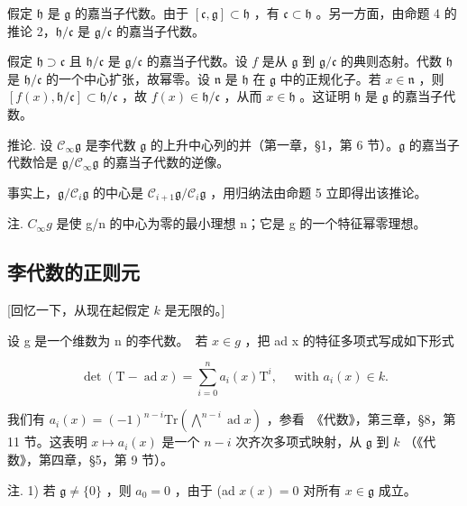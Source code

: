 假定 \(\mathfrak{h}\) 是 \(\mathfrak{g}\) 的嘉当子代数。由于 \([\mathfrak{c},\mathfrak{g}]\subset \mathfrak{h}\) ，有 \(\mathfrak{c}\subset \mathfrak{h}\) 。另一方面，由命题 4 的推论 2，\(\mathfrak{h} / \mathfrak{c}\) 是 \(\mathfrak{g} / \mathfrak{c}\) 的嘉当子代数。

假定 \(\mathfrak{h} \supset \mathfrak{c}\) 且 \(\mathfrak{h} / \mathfrak{c}\) 是 \(\mathfrak{g} / \mathfrak{c}\) 的嘉当子代数。设 \(f\) 是从 \(\mathfrak{g}\) 到 \(\mathfrak{g} / \mathfrak{c}\) 的典则态射。代数 \(\mathfrak{h}\) 是 \(\mathfrak{h} / \mathfrak{c}\) 的一个中心扩张，故幂零。设 \(\mathfrak{n}\) 是 \(\mathfrak{h}\) 在 \(\mathfrak{g}\) 中的正规化子。若 \(x \in \mathfrak{n}\) ，则 \([f(x), \mathfrak{h} / \mathfrak{c}] \subset \mathfrak{h} / \mathfrak{c}\) ，故 \(f(x) \in \mathfrak{h} / \mathfrak{c}\) ，从而 \(x \in \mathfrak{h}\) 。这证明 \(\mathfrak{h}\) 是 \(\mathfrak{g}\) 的嘉当子代数。

推论. 设 \(\mathcal{C}_{\infty}\mathfrak{g}\) 是李代数 \(\mathfrak{g}\) 的上升中心列的并（第一章，§1，第 6 节）。\(\mathfrak{g}\) 的嘉当子代数恰是 \(\mathfrak{g}/\mathcal{C}_{\infty}\mathfrak{g}\) 的嘉当子代数的逆像。

事实上，\(\mathfrak{g} / \mathcal{C}_i\mathfrak{g}\) 的中心是 \(\mathcal{C}_{i + 1}\mathfrak{g} / \mathcal{C}_i\mathfrak{g}\) ，用归纳法由命题 5 立即得出该推论。

注. \(C_{\infty}g\) 是使 g/n 的中心为零的最小理想 n；它是 g 的一个特征幂零理想。

\subsection{李代数的正则元}

{[}回忆一下，从现在起假定 \(k\) 是无限的。{]}

设 g 是一个维数为 n 的李代数。~若 \(x \in g\) ，把 ad x 的特征多项式写成如下形式

\[
\det (\mathrm{T} - \operatorname{ad} x) = \sum_ {i = 0} ^ {n} a _ {i} (x) \mathrm{T} ^ {i}, \quad \text { with } a _ {i} (x) \in k.
\]

我们有 \(a_i(x) = (-1)^{n - i}\mathrm{Tr}\left(\bigwedge^{n - i}\operatorname {ad}x\right)\) ，参看~《代数》，第三章，§8，第 11 节。这表明 \(x\mapsto a_i(x)\) 是一个 \(n - i\) 次齐次多项式映射，从 \(\mathfrak{g}\) 到 \(k\) （《代数》，第四章，§5，第 9 节）。

注. 1) 若 \(\mathfrak{g} \neq \{0\}\) ，则 \(a_0 = 0\) ，由于 (ad \(x(x) = 0\) 对所有 \(x \in \mathfrak{g}\) 成立。

